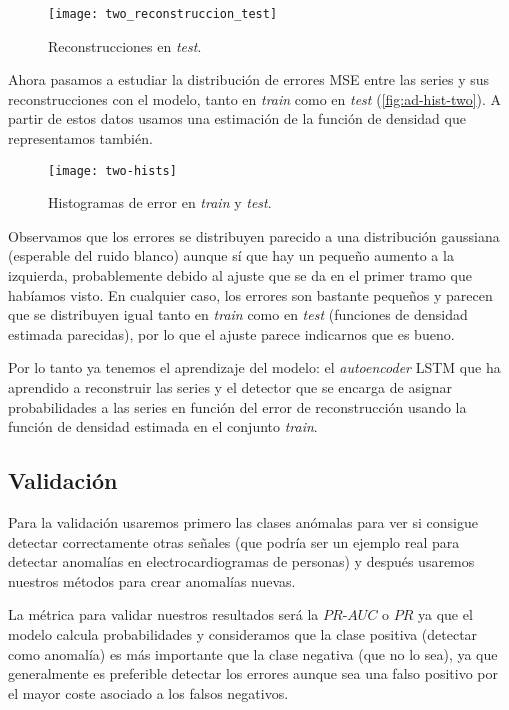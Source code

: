 \begin{figure}[htpb]
  \centering
  \texttt{[image: two\_reconstruccion\_test]}
  \caption{Reconstrucciones en \emph{test}.}
  \label{fig:ad-reconstruccion-two-test}
\end{figure}

Ahora pasamos a estudiar la distribución de errores MSE entre las series y sus reconstrucciones con el modelo, tanto en \emph{train} como en \emph{test} (\autoref{fig:ad-hist-two}). A partir de estos datos usamos una estimación de la función de densidad que representamos también.

\begin{figure}[htpb]
  \centering
  \texttt{[image: two-hists]}
  \caption{Histogramas de error en \emph{train} y \emph{test}.}
  \label{fig:ad-hist-two}
\end{figure}

Observamos que los errores se distribuyen parecido a una distribución gaussiana (esperable del ruido blanco) aunque sí que hay un pequeño aumento a la izquierda, probablemente debido al ajuste que se da en el primer tramo que habíamos visto. En cualquier caso, los errores son bastante pequeños y parecen que se distribuyen igual tanto en \emph{train} como en \emph{test} (funciones de densidad estimada parecidas), por lo que el ajuste parece indicarnos que es bueno.

Por lo tanto ya tenemos el aprendizaje del modelo: el \emph{autoencoder} LSTM que ha aprendido a reconstruir las series y el detector que se encarga de asignar probabilidades a las series en función del error de reconstrucción usando la función de densidad estimada en el conjunto \emph{train}.

\subsection{Validación}

Para la validación usaremos primero las clases anómalas para ver si consigue detectar correctamente otras señales (que podría ser un ejemplo real para detectar anomalías en electrocardiogramas de personas) y después usaremos nuestros métodos para crear anomalías nuevas.

La métrica para validar nuestros resultados será la $PR$-$AUC$ o $PR$ ya que el modelo calcula probabilidades y consideramos que la clase positiva (detectar como anomalía) es más importante que la clase negativa (que no lo sea), ya que generalmente es preferible detectar los errores aunque sea una falso positivo por el mayor coste asociado a los falsos negativos.

